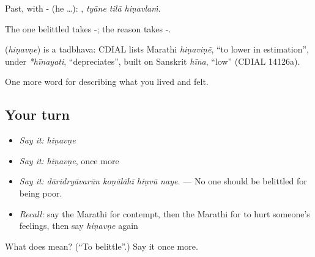 Past, with - (he …):   , \emph{tyāne tilā hiṇavlaṁ}.

The one belittled takes -; the reason takes -.

\begin{cousinweb}
\textbf{} (\emph{hiṇavṇe}) is a tadbhava: CDIAL lists Marathi \emph{hiṇaviṇẽ}, \textquotedblleft{}to lower in estimation\textquotedblright{}, under \emph{*hīnayati}, \textquotedblleft{}depreciates\textquotedblright{}, built on Sanskrit \emph{hīna}, \textquotedblleft{}low\textquotedblright{} (CDIAL 14126a).
\end{cousinweb}

\begin{grammarlens}[title={What you've built}]
One more word for describing what you lived and felt.
\end{grammarlens}

\subsection*{Your turn}
\begin{itemize}
\raggedright
  \item \emph{Say it:} \emph{hiṇavṇe}
  \item \emph{Say it:} \emph{hiṇavṇe}, once more
  \item \emph{Say it:} \emph{dāridryāvarūn koṇālāhī hiṇvū naye.} — No one should be belittled for being poor.
  \item \emph{Recall:} say the Marathi for contempt, then the Marathi for to hurt someone's feelings, then say \emph{hiṇavṇe} again
\end{itemize}

\begin{tcolorbox}[breakable,colback=teal!4,colframe=teal!35!black,title={Before you move on}]
What does  mean? (\textquotedblleft{}To belittle\textquotedblright{}.) Say it once more.
\end{tcolorbox}
